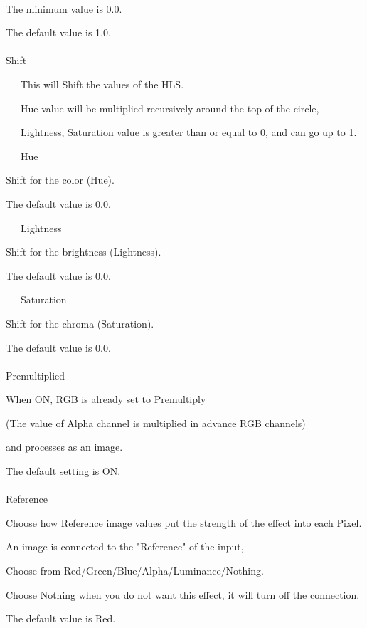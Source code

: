 \documentclass[a4paper,12pt]{article}
\begin{document}
\newpage

\thispagestyle{empty}

\ \vspace{-0.2em}
\par
The minimum value is 0.0.\par
The default value is 1.0.\\
\\
Shift\par
\noindent \ \ \, This will Shift the values of the HLS.\par
\noindent \ \ \, Hue value will be multiplied recursively around the top of the circle,\par
\noindent \ \ \, Lightness, Saturation value is greater than or equal to 0, and can go up to 1.\\
\par
\noindent \ \ \, Hue\par
Shift for the color (Hue).\par
The default value is 0.0.\par
\noindent \ \ \, Lightness\par
Shift for the brightness (Lightness).\par
The default value is 0.0.\par
\noindent \ \ \, Saturation\par
Shift for the chroma (Saturation).\par
The default value is 0.0.\\
\\
Premultiplied\par
When ON, RGB is already set to Premultiply\par
(The value of Alpha channel is multiplied in advance RGB channels)\par
and processes as an image.\par
The default setting is ON.\\
\\
Reference\par
Choose how Reference image values put the strength of the effect into each Pixel.\par
An image is connected to the "Reference" of the input,\par
Choose from Red/Green/Blue/Alpha/Luminance/Nothing.\par
Choose Nothing when you do not want this effect, it will turn off the connection.\par
The default value is Red.
\end{document}
